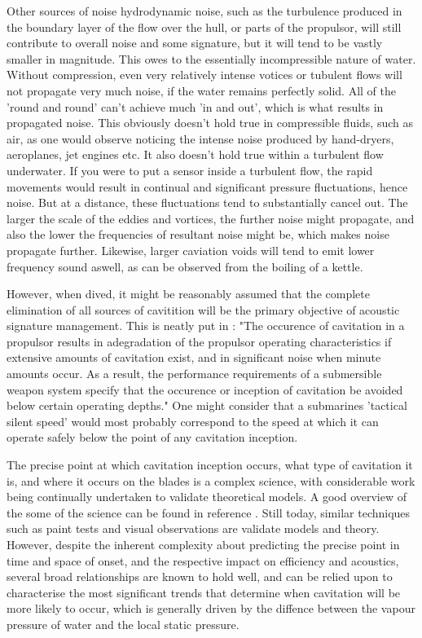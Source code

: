 \documentclass{article}\usepackage[]{graphicx}\usepackage[]{color}
\begin{document}
Other sources of noise hydrodynamic noise, such as the turbulence produced in the boundary layer of the flow over the hull, or parts of the propulsor, will still contribute to overall noise and some signature, but it will tend to be vastly smaller in magnitude.  This owes to the essentially incompressible nature of water.  Without compression, even very relatively intense votices or tubulent flows will not propagate very much noise, if the water remains perfectly solid.  All of the 'round and round' can't achieve much 'in and out', which is what results in propagated noise.  This obviously doesn't hold true in compressible fluids, such as air, as one would observe noticing the intense noise produced by hand-dryers, aeroplanes, jet engines etc.  It also doesn't hold true within a turbulent flow underwater.  If you were to put a sensor inside a turbulent flow, the rapid movements would result in continual and significant pressure fluctuations, hence noise.  But at a distance, these fluctuations tend to substantially cancel out.  The larger the scale of the eddies and vortices, the further noise might propagate, and also the lower the frequencies of resultant noise might be, which makes noise propagate further.  Likewise, larger caviation voids will tend to emit lower frequency sound aswell, as can be observed from the boiling of a kettle.

However, when dived, it might be reasonably assumed that the complete elimination of all sources of cavitition will be the primary objective of acoustic signature management.  This is neatly put in \cite[88]{gearhart1966selection}: "The occurence of cavitation in a propulsor results in adegradation of the propulsor operating characteristics if extensive amounts of cavitation exist, and in significant noise when minute amounts occur.  As a result, the performance requirements of a submersible weapon system specify that the occurence or inception of cavitation be avoided below certain operating depths." One might consider that a submarines 'tactical silent speed' would most probably correspond to the speed at which it can operate safely below the point of any cavitation inception.

The precise point at which cavitation inception occurs, what type of cavitation it is, and where it occurs on the blades is a complex science, with considerable work being continually undertaken to validate theoretical models. A good overview of the some of the science can be found in reference \cite{kuiper1981cavitation}.  Still today, similar techniques such as paint tests and visual observations are validate models and theory. However, despite the inherent complexity about predicting the precise point in time and space of onset, and the respective impact on efficiency and acoustics, several broad relationships are known to hold well, and can be relied upon to characterise the most significant trends that determine when cavitation will be more likely to occur, which is generally driven by the diffence between the vapour pressure of water and the local static pressure.
\end{document}
